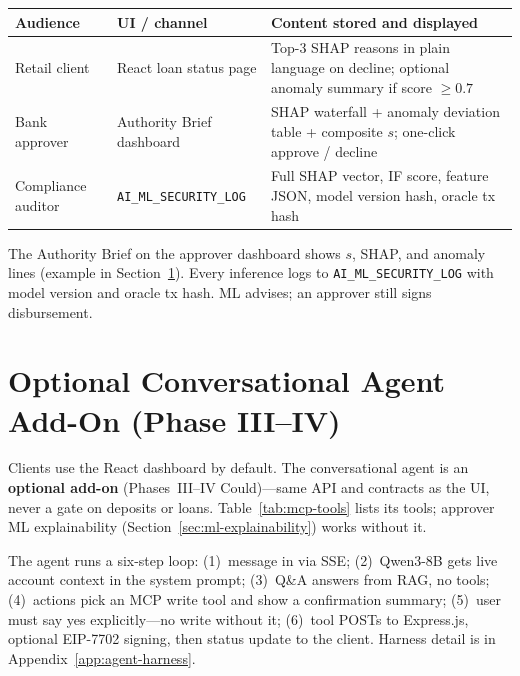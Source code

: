 \documentclass[12pt, a4paper]{report}
\newcommand{\tableheadcolor}{\rowcolor{TableHeadBg}}
\begin{document}
\begin{table}[H]
\centering
\begin{tabular}{p{2.2cm}p{3.2cm}p{7.8cm}}
\toprule
\tableheadcolor
\textbf{Audience} & \textbf{UI / channel} & \textbf{Content stored and displayed} \\
\midrule
Retail client & React loan status page & Top-3 SHAP reasons in plain language on decline; optional anomaly summary if score $\ge 0.7$ \\
Bank approver & Authority Brief dashboard & SHAP waterfall + anomaly deviation table + composite $s$; one-click approve / decline \\
Compliance auditor & \texttt{AI\_ML\_SECURITY\_LOG} & Full SHAP vector, IF score, feature JSON, model version hash, oracle tx hash \\
\bottomrule
\end{tabular}
\end{table}

The Authority Brief on the approver dashboard shows $s$, SHAP, and anomaly lines (example in Section~\ref{sec:optional-agent}). Every inference logs to \texttt{AI\_ML\_SECURITY\_LOG} with model version and oracle tx hash. ML advises; an approver still signs disbursement.

\section{Optional Conversational Agent Add-On (Phase III--IV)}
\label{sec:optional-agent}

Clients use the React dashboard by default. The conversational agent is an \textbf{optional add-on} (Phases~III--IV Could)---same API and contracts as the UI, never a gate on deposits or loans. Table~\ref{tab:mcp-tools} lists its tools; approver ML explainability (Section~\ref{sec:ml-explainability}) works without it.

The agent runs a six-step loop: (1)~message in via SSE; (2)~Qwen3-8B gets live account context in the system prompt; (3)~Q\&A answers from RAG, no tools; (4)~actions pick an MCP write tool and show a confirmation summary; (5)~user must say yes explicitly---no write without it; (6)~tool POSTs to Express.js, optional EIP-7702 signing, then status update to the client. Harness detail is in Appendix~\ref{app:agent-harness}.
\end{document}
